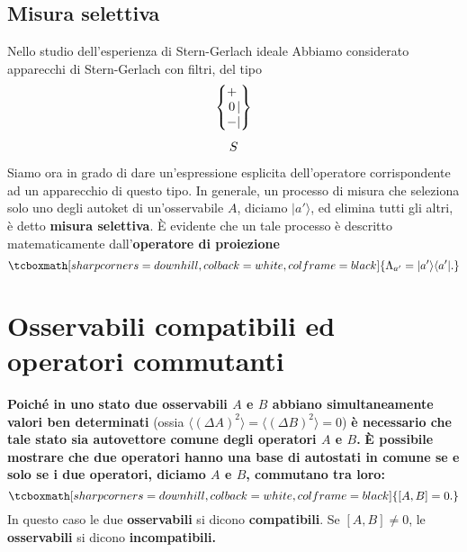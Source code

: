 \documentclass[a4paper,12pt,oneside]{book}
\begin{document}
\subsection{Misura selettiva}
Nello studio dell'esperienza di Stern-Gerlach ideale Abbiamo considerato apparecchi di Stern-Gerlach con filtri, del tipo
	\begin{equation}
		\begin{matrix}
		\begin{Bmatrix}
 			\makebox[\widthof{$-$}]{$+$}\makebox[\widthof{$|$}]{$\ $} \\ \makebox[\widthof{$-$}]{$0$}|\\ - | 
		\end{Bmatrix} \\[0.7cm]
			S
		\end{matrix}
	\end{equation}
Siamo ora in grado di dare un'espressione esplicita dell'operatore corrispondente ad un apparecchio di questo tipo. In generale, un processo di misura che seleziona solo uno degli autoket di un'osservabile $A$, diciamo $\vert a' \rangle $, ed elimina tutti gli altri, è detto \textbf{misura selettiva}. È evidente che un tale processo è descritto matematicamente dall'\textbf{operatore di proiezione}
	\begin{equation}
		\tcboxmath[sharp corners=downhill, colback=white, colframe=black]{
		\Lambda _{a'} = \vert a' \rangle \langle a'\vert.
		}
	\end{equation}
\section{Osservabili compatibili ed operatori commutanti}
\textbf{Poiché in uno stato due osservabili $A$ e $B$ abbiano simultaneamente valori ben determinati} (ossia $\langle (\Delta A ) ^2 \rangle = \langle (\Delta B ) ^2 \rangle =0$) \textbf{è necessario che tale stato sia autovettore comune degli operatori $A$ e $B$.} \textbf{È possibile mostrare che due operatori hanno una base di autostati in comune se e solo se i due operatori, diciamo $A$ e $B$, commutano tra loro:}
	\begin{equation}
		\tcboxmath[sharp corners=downhill, colback=white, colframe=black]{
			\left[ A, B \right] =0.
			}
	\end{equation}
In questo caso le due \textbf{osservabili} si dicono \textbf{compatibili}. Se $\left[ A, B\right] \neq 0$, le \textbf{osservabili} si dicono \textbf{incompatibili.}\\
\end{document}
